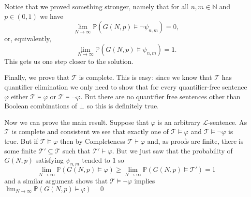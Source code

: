 \documentclass{article}
\begin{document}
\begin{enumerate}[leftmargin=*]
		Notice that we proved something stronger, namely that for all $n,m\in\mathbb{N}$ and $p\in(0,1)$ we have
		\[
			\lim_{N\to \infty} \mathbb{P}(G(N,p) \models \neg \psi_{n,m}) = 0,
		\]
		or, equivalently,
		\[
			\lim_{N\to \infty} \mathbb{P}(G(N,p) \models \psi_{n,m}) = 1.
		\]
		This gets us one step closer to the solution.
		
		Finally, we prove that $\mathcal{T}$ is complete. This is easy: since we know that $\mathcal{T}$ has quantifier elimination we only need to show that for every quantifier-free sentence $\varphi$ either $\mathcal{T}\models \varphi$ or $\mathcal{T}\models \neg\varphi$. But there are no quantifier free sentences other than Boolean combinations of $\bot$ so this is definitely true. 
		
		Now we can prove the main result. Suppose that $\varphi$ is an arbitrary $\mathcal{L}$-sentence. As $\mathcal{T}$ is complete and consistent we see that exactly one of $\mathcal{T}\models \varphi$ and $\mathcal{T}\models \neg\varphi$ is true. But if $\mathcal{T}\models \varphi$ then by Completeness $\mathcal{T}\vdash \varphi$ and, as proofs are finite, there is some finite $\mathcal{T}'\subseteq \mathcal{T}$ such that $\mathcal{T}'\vdash \varphi$. But we just saw that the probability of $G(N,p)$ satisfying $\psi_{n,m}$ tended to $1$ so
		\[
			\lim_{N\to\infty} \mathbb{P}(G(N,p) \models \varphi)\geq \lim_{N\to\infty} \mathbb{P}(G(N,p) \models \mathcal{T}') = 1
		\]
		and a similar argument shows that $\mathcal{T}\models \neg\varphi$ implies $\lim_{N\to\infty} \mathbb{P}(G(N,p) \models \varphi) = 0$
		
	\end{enumerate}
\end{document}
